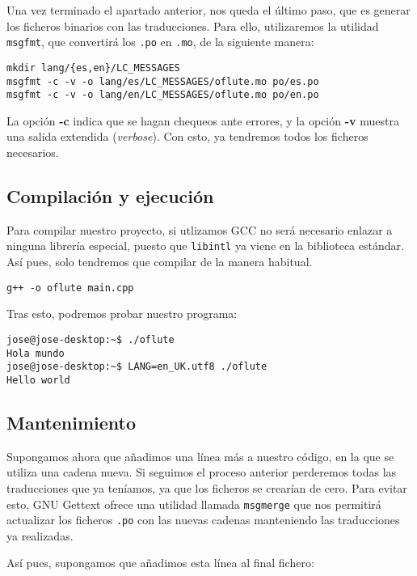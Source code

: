 Una vez terminado el apartado anterior, nos queda el último paso, que es generar
los ficheros binarios con las traducciones. Para ello, utilizaremos la utilidad
\texttt{msgfmt}, que convertirá los \texttt{.po} en \texttt{.mo}, de la
siguiente manera:

\begin{verbatim}
mkdir lang/{es,en}/LC_MESSAGES
msgfmt -c -v -o lang/es/LC_MESSAGES/oflute.mo po/es.po 
msgfmt -c -v -o lang/en/LC_MESSAGES/oflute.mo po/en.po
\end{verbatim}

La opción \textbf{-c} indica que se hagan chequeos ante errores, y la opción
\textbf{-v} muestra una salida extendida (\textit{verbose}). Con esto, ya
tendremos todos los ficheros necesarios.

\subsection{Compilación y ejecución}

Para compilar nuestro proyecto, si utlizamos GCC no será necesario enlazar a
ninguna librería especial, puesto que \texttt{libintl} ya viene en la biblioteca
estándar. Así pues, solo tendremos que compilar de la manera habitual.

\begin{verbatim}
g++ -o oflute main.cpp  
\end{verbatim}

Tras esto, podremos probar nuestro programa:
\begin{verbatim}
jose@jose-desktop:~$ ./oflute 
Hola mundo
jose@jose-desktop:~$ LANG=en_UK.utf8 ./oflute 
Hello world
\end{verbatim}

\subsection{Mantenimiento}

Supongamos ahora que añadimos una línea más a nuestro código, en la que se
utiliza una cadena nueva. Si seguimos el proceso anterior perderemos todas las
traducciones que ya teníamos, ya que los ficheros se crearían de cero. Para
evitar esto, GNU Gettext ofrece una utilidad llamada \texttt{msgmerge} que nos
permitirá actualizar los ficheros \texttt{.po} con las nuevas cadenas
manteniendo las traducciones ya realizadas.

\medskip

Así pues, supongamos que añadimos esta línea al final fichero:


